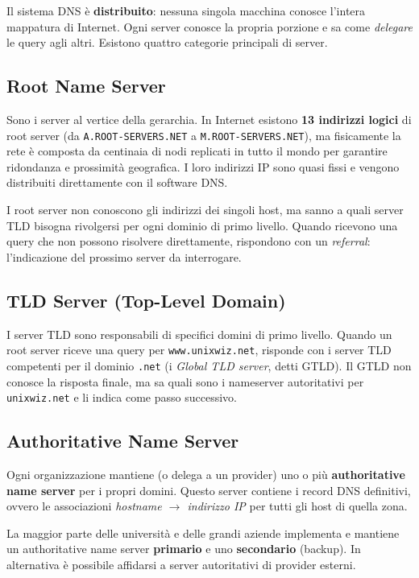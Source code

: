 \documentclass{article}
\begin{document}
Il sistema DNS è \textbf{distribuito}: nessuna singola macchina conosce
l'intera mappatura di Internet. Ogni server conosce la propria porzione e
sa come \emph{delegare} le query agli altri. Esistono quattro categorie
principali di server.

\subsection*{Root Name Server}

Sono i server al vertice della gerarchia. In Internet esistono \textbf{13
indirizzi logici} di root server (da \texttt{A.ROOT-SERVERS.NET} a
\texttt{M.ROOT-SERVERS.NET}), ma fisicamente la rete è composta da centinaia
di nodi replicati in tutto il mondo per garantire ridondanza e prossimità
geografica. I loro indirizzi IP sono quasi fissi e vengono distribuiti
direttamente con il software DNS.

I root server non conoscono gli indirizzi dei singoli host, ma sanno a quali
server TLD bisogna rivolgersi per ogni dominio di primo livello. Quando
ricevono una query che non possono risolvere direttamente, rispondono con
un \emph{referral}: l'indicazione del prossimo server da interrogare.

\subsection*{TLD Server (Top-Level Domain)}

I server TLD sono responsabili di specifici domini di primo livello.
Quando un root server riceve una query per \texttt{www.unixwiz.net}, risponde
con i server TLD competenti per il dominio \texttt{.net} (i \emph{Global TLD
server}, detti GTLD). Il GTLD non conosce la risposta finale, ma sa quali
sono i nameserver autoritativi per \texttt{unixwiz.net} e li indica come
passo successivo.

\subsection*{Authoritative Name Server}

Ogni organizzazione mantiene (o delega a un provider) uno o più
\textbf{authoritative name server} per i propri domini. Questo server
contiene i record DNS definitivi, ovvero le associazioni
\emph{hostname $\to$ indirizzo IP} per tutti gli host di quella zona.

La maggior parte delle università e delle grandi aziende implementa e
mantiene un authoritative name server \textbf{primario} e uno
\textbf{secondario} (backup). In alternativa è possibile affidarsi a server
autoritativi di provider esterni.
\end{document}

